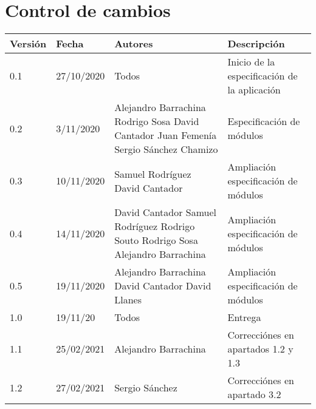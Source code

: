 \documentclass[12pt]{article}
\begin{document}
\section*{Control de cambios} %
\noindent\begin{tabularx}{\textwidth}{ |l|l|p{5cm}|X| }
	\hline
	\textbf{Versión} & \textbf{Fecha} & \textbf{Autores}                                                                                                         & \textbf{Descripción}                         \\
	\hline
	0.1              & 27/10/2020     & Todos                                                                                                                    & Inicio de la especificación de la aplicación \\
	\hline
	0.2              & 3/11/2020      & Alejandro Barrachina \newline Rodrigo Sosa \newline David Cantador \newline Juan Femenía \newline Sergio Sánchez Chamizo & Especificación de módulos                    \\
	\hline
	0.3              & 10/11/2020     & Samuel Rodríguez \newline David Cantador                                                                                 & Ampliación especificación de módulos         \\
	\hline
	0.4              & 14/11/2020     & David Cantador \newline Samuel Rodríguez \newline Rodrigo Souto \newline Rodrigo Sosa \newline Alejandro Barrachina      & Ampliación especificación de módulos         \\
	\hline
	0.5              & 19/11/2020     & Alejandro Barrachina \newline David Cantador \newline David Llanes                                                       & Ampliación especificación de módulos         \\
	\hline
	1.0              & 19/11/20       & Todos                                                                                                                    & Entrega                                      \\
	\hline
	1.1              & 25/02/2021     & Alejandro Barrachina                                                                                                     & Correcciónes en apartados 1.2 y 1.3          \\
	\hline
	1.2              & 27/02/2021     & Sergio Sánchez                                                                                                           & Correcciónes en apartado 3.2                 \\
	\hline
\end{tabularx}

\newpage
\tableofcontents
\newpage


\newpage

\newpage

\end{document}
